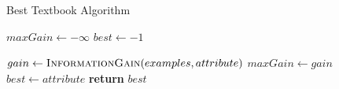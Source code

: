 \begin{algorithm}[H]
\caption{Best Textbook Algorithm}\label{a:id3-best-simple}
\begin{algorithmic}[1]
    \State $maxGain \gets -\infty$
    \State $best \gets -1$

        \State $gain \gets  \textsc{InformationGain}(examples, attribute)$
            \State $maxGain \gets gain$
            \State $best \gets attribute$
        \EndIf
    \EndFor
    \State \textbf{return} $best$
\EndProcedure
\end{algorithmic}
\end{algorithm}